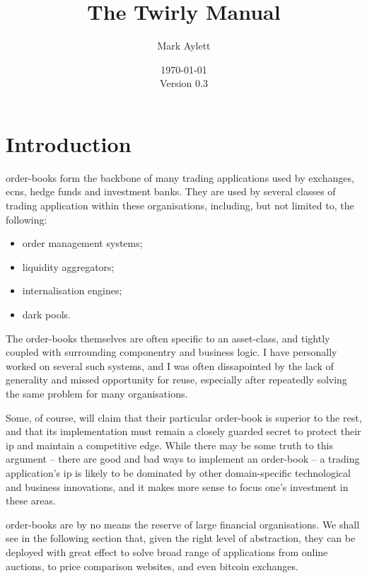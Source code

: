 \documentclass[11pt,a4paper]{article}
\begin{document}
\title{The Twirly Manual}
\author{Mark Aylett}
\date{\today\\Version 0.3}
\maketitle

\tableofcontents

\section{Introduction}

\Glspl{order-book} form the backbone of many trading applications used by \glspl{exchange},
\glspl{ecn}, hedge funds and investment banks. They are used by several classes of trading
application within these organisations, including, but not limited to, the following:

\begin{itemize}
\item order management systems;
\item liquidity aggregators;
\item internalisation engines;
\item dark pools.
\end{itemize}

The \glspl{order-book} themselves are often specific to an \gls{asset}-class, and tightly coupled
with surrounding componentry and business logic. I have personally worked on several such systems,
and I was often dissapointed by the lack of generality and missed opportunity for reuse, especially
after repeatedly solving the same problem for many organisations.

Some, of course, will claim that their particular \gls{order-book} is superior to the rest, and that
its implementation must remain a closely guarded secret to protect their \gls{ip} and maintain a
competitive edge. While there may be some truth to this argument -- there are good and bad ways to
implement an \gls{order-book} -- a trading application's \gls{ip} is likely to be dominated by other
domain-specific technological and business innovations, and it makes more sense to focus one's
investment in these areas.

\Glspl{order-book} are by no means the reserve of large financial organisations. We shall see in the
following section that, given the right level of abstraction, they can be deployed with great effect
to solve broad range of applications from online \glspl{auction}, to price comparison websites, and
even \gls{bitcoin} \glspl{exchange}.
\end{document}
